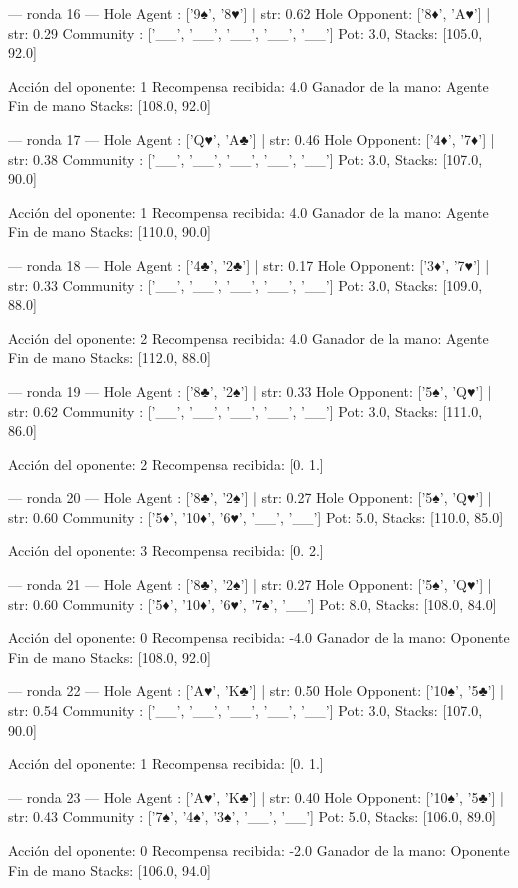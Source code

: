 --- ronda 16 ---
Hole Agent : ['9♠', '8♥'] | str: 0.62
Hole Opponent: ['8♦', 'A♥'] | str: 0.29
Community  : ['__', '__', '__', '__', '__']
Pot: 3.0, Stacks: [105.0, 92.0]

Acción del oponente: 1
Recompensa recibida: 4.0
Ganador de la mano: Agente
Fin de mano Stacks: [108.0, 92.0]


--- ronda 17 ---
Hole Agent : ['Q♥', 'A♣'] | str: 0.46
Hole Opponent: ['4♦', '7♦'] | str: 0.38
Community  : ['__', '__', '__', '__', '__']
Pot: 3.0, Stacks: [107.0, 90.0]

Acción del oponente: 1
Recompensa recibida: 4.0
Ganador de la mano: Agente
Fin de mano Stacks: [110.0, 90.0]


--- ronda 18 ---
Hole Agent : ['4♣', '2♣'] | str: 0.17
Hole Opponent: ['3♦', '7♥'] | str: 0.33
Community  : ['__', '__', '__', '__', '__']
Pot: 3.0, Stacks: [109.0, 88.0]

Acción del oponente: 2
Recompensa recibida: 4.0
Ganador de la mano: Agente
Fin de mano Stacks: [112.0, 88.0]


--- ronda 19 ---
Hole Agent : ['8♣', '2♠'] | str: 0.33
Hole Opponent: ['5♠', 'Q♥'] | str: 0.62
Community  : ['__', '__', '__', '__', '__']
Pot: 3.0, Stacks: [111.0, 86.0]

Acción del oponente: 2
Recompensa recibida: [0. 1.]

--- ronda 20 ---
Hole Agent : ['8♣', '2♠'] | str: 0.27
Hole Opponent: ['5♠', 'Q♥'] | str: 0.60
Community  : ['5♦', '10♦', '6♥', '__', '__']
Pot: 5.0, Stacks: [110.0, 85.0]

Acción del oponente: 3
Recompensa recibida: [0. 2.]

--- ronda 21 ---
Hole Agent : ['8♣', '2♠'] | str: 0.27
Hole Opponent: ['5♠', 'Q♥'] | str: 0.60
Community  : ['5♦', '10♦', '6♥', '7♠', '__']
Pot: 8.0, Stacks: [108.0, 84.0]

Acción del oponente: 0
Recompensa recibida: -4.0
Ganador de la mano: Oponente
Fin de mano Stacks: [108.0, 92.0]


--- ronda 22 ---
Hole Agent : ['A♥', 'K♣'] | str: 0.50
Hole Opponent: ['10♠', '5♣'] | str: 0.54
Community  : ['__', '__', '__', '__', '__']
Pot: 3.0, Stacks: [107.0, 90.0]

Acción del oponente: 1
Recompensa recibida: [0. 1.]

--- ronda 23 ---
Hole Agent : ['A♥', 'K♣'] | str: 0.40
Hole Opponent: ['10♠', '5♣'] | str: 0.43
Community  : ['7♠', '4♠', '3♠', '__', '__']
Pot: 5.0, Stacks: [106.0, 89.0]

Acción del oponente: 0
Recompensa recibida: -2.0
Ganador de la mano: Oponente
Fin de mano Stacks: [106.0, 94.0]



